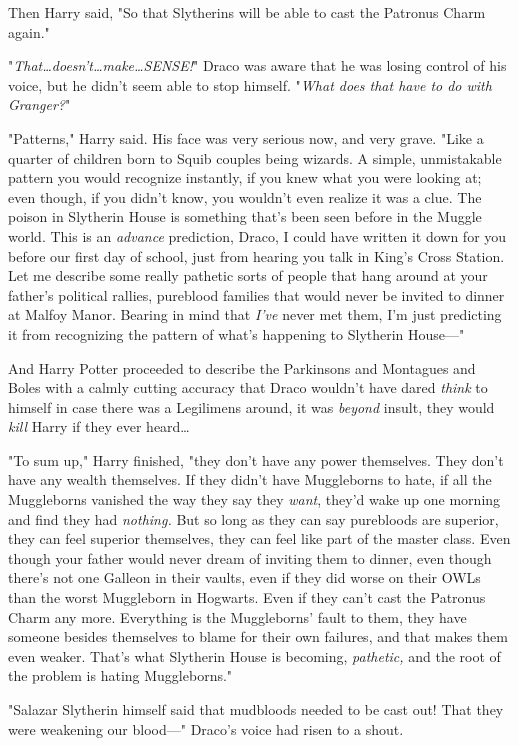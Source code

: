 Then Harry said, "So that Slytherins will be able to cast the Patronus Charm
again."

"\emph{That…doesn’t…make…SENSE!}" Draco was aware that
he was losing control of his voice, but he didn’t seem able to stop himself.
"\emph{What does that have to do with Granger?}"

"Patterns," Harry said. His face was very serious now, and very grave. "Like a
quarter of children born to Squib couples being wizards. A simple, unmistakable
pattern you would recognize instantly, if you knew what you were looking at;
even though, if you didn’t know, you wouldn’t even realize it was a clue. The
poison in Slytherin House is something that’s been seen before in the Muggle
world. This is an \emph{advance} prediction, Draco, I could have written it
down for you before our first day of school, just from hearing you talk in
King’s Cross Station. Let me describe some really pathetic sorts of people that
hang around at your father’s political rallies, pureblood families that would
never be invited to dinner at Malfoy Manor. Bearing in mind that \emph{I’ve}
never met them, I’m just predicting it from recognizing the pattern of what’s
happening to Slytherin House—"

And Harry Potter proceeded to describe the Parkinsons and Montagues and Boles
with a calmly cutting accuracy that Draco wouldn’t have dared \emph{think} to
himself in case there was a Legilimens around, it was \emph{beyond} insult,
they would \emph{kill} Harry if they ever heard…

"To sum up," Harry finished, "they don’t have any power themselves. They don’t
have any wealth themselves. If they didn’t have Muggleborns to hate, if all the
Muggleborns vanished the way they say they \emph{want}, they’d wake up one
morning and find they had \emph{nothing.} But so long as they can say
purebloods are superior, they can feel superior themselves, they can feel like
part of the master class. Even though your father would never dream of inviting
them to dinner, even though there’s not one Galleon in their vaults, even if
they did worse on their OWLs than the worst Muggleborn in Hogwarts. Even if
they can’t cast the Patronus Charm any more. Everything is the Muggleborns’
fault to them, they have someone besides themselves to blame for their own
failures, and that makes them even weaker. That’s what Slytherin House is
becoming, \emph{pathetic,} and the root of the problem is hating Muggleborns."

"Salazar Slytherin himself said that mudbloods needed to be cast out! That they
were weakening our blood—" Draco’s voice had risen to a shout.

